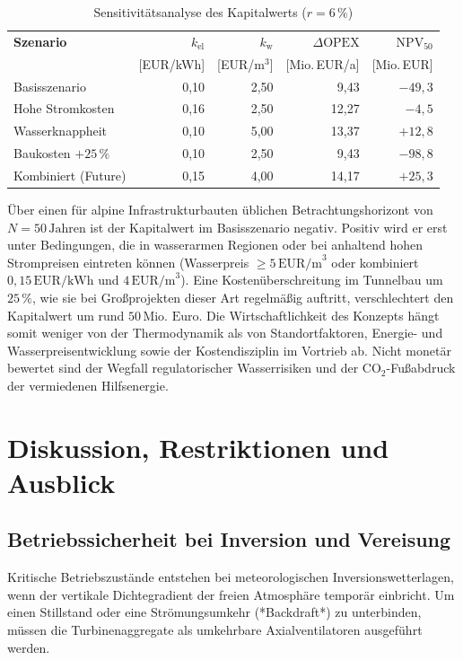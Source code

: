 \documentclass[journal]{IEEEtran}
\begin{document}
\begin{table}[htbp]
\caption{Sensitivitätsanalyse des Kapitalwerts ($r = 6\,\%$)}
\label{tab:sensitivity}
\centering
\footnotesize\setlength{\tabcolsep}{4pt}
\begin{tabular}{@{}l r r r r@{}}
\toprule
\textbf{Szenario} & $k_{\text{el}}$ & $k_{\text{w}}$ & $\Delta\text{OPEX}$ & $\text{NPV}_{50}$ \\
 & [EUR/kWh] & [EUR/m$^3$] & [Mio.\,EUR/a] & [Mio.\,EUR] \\
\midrule
Basisszenario & 0,10 & 2,50 & 9,43 & $-49{,}3$ \\
Hohe Stromkosten & 0,16 & 2,50 & 12,27 & $-4{,}5$ \\
Wasserknappheit & 0,10 & 5,00 & 13,37 & $+12{,}8$ \\
Baukosten $+25\,\%$ & 0,10 & 2,50 & 9,43 & $-98{,}8$ \\
Kombiniert (Future) & 0,15 & 4,00 & 14,17 & $+25{,}3$ \\
\bottomrule
\end{tabular}
\end{table}

Über einen für alpine Infrastrukturbauten üblichen Betrachtungshorizont von $N = 50\,\text{Jahren}$ ist der Kapitalwert im Basisszenario negativ. Positiv wird er erst unter Bedingungen, die in wasserarmen Regionen oder bei anhaltend hohen Strompreisen eintreten können (Wasserpreis $\geq 5\,\text{EUR/m}^3$ oder kombiniert $0{,}15\,\text{EUR/kWh}$ und $4\,\text{EUR/m}^3$). Eine Kostenüberschreitung im Tunnelbau um $25\,\%$, wie sie bei Großprojekten dieser Art regelmäßig auftritt, verschlechtert den Kapitalwert um rund $50\,\text{Mio. Euro}$. Die Wirtschaftlichkeit des Konzepts hängt somit weniger von der Thermodynamik als von Standortfaktoren, Energie- und Wasserpreisentwicklung sowie der Kostendisziplin im Vortrieb ab. Nicht monetär bewertet sind der Wegfall regulatorischer Wasserrisiken und der CO$_2$-Fußabdruck der vermiedenen Hilfsenergie.

\section{Diskussion, Restriktionen und Ausblick}

\subsection{Betriebssicherheit bei Inversion und Vereisung}
Kritische Betriebszustände entstehen bei meteorologischen Inversionswetterlagen, wenn der vertikale Dichtegradient der freien Atmosphäre temporär einbricht. Um einen Stillstand oder eine Strömungsumkehr (*Backdraft*) zu unterbinden, müssen die Turbinenaggregate als umkehrbare Axialventilatoren ausgeführt werden. 
\end{document}
